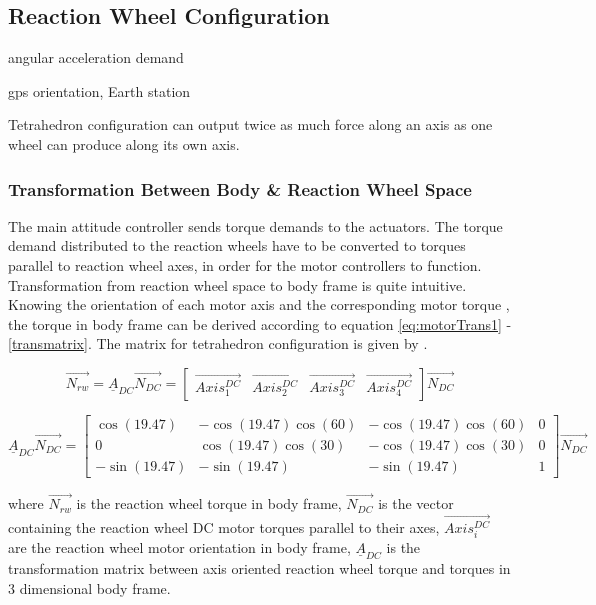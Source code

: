 
\subsection{Reaction Wheel Configuration}

angular acceleration demand \cite{reactionWheelConfigThesis} 

gps orientation, Earth station

Tetrahedron configuration can output twice as much force along an axis as one wheel can produce along its own axis.

\subsubsection{Transformation Between Body \& Reaction Wheel Space}

The main attitude controller sends torque demands to the actuators. The torque demand distributed to the reaction wheels have to be converted to torques parallel to reaction wheel axes, in order for the motor controllers to function. Transformation from reaction wheel space to body frame is quite intuitive. Knowing the orientation of each motor axis and the corresponding motor torque 
, the torque in body frame can be derived according to equation \ref{eq:motorTrans1} - \ref{transmatrix}. The matrix for tetrahedron configuration is given by \cite{reactionWheelConfigThesis}.

\begin{equation}
\label{eq:motorTrans1}
\vec{N_{rw}} = \underline{A}_{DC} \vec{N_{DC}} = \begin{bmatrix}
\vec{Axis^{DC}_{1}}       & \vec{Axis^{DC}_{2}}   & \vec{Axis^{DC}_{3}}   & \vec{Axis^{DC}_{4}} 
\end{bmatrix} \vec{N_{DC}}
\end{equation}

\begin{equation}
\underline{A}_{DC} \vec{N_{DC}}  = 
\begin{bmatrix}
\cos(19.47)       & -\cos(19.47) \cos(60)  &  -\cos(19.47) \cos(60)  & 0 \\
0       & \cos(19.47) \cos(30)  &  -\cos(19.47) \cos(30)  & 0 \\
-\sin(19.47)       & -\sin(19.47)   &  -\sin(19.47)   & 1
\end{bmatrix} \vec{N_{DC}}
\label{transmatrix}
\end{equation}

where $\vec{N_{rw}}$ is the reaction wheel torque in body frame, $\vec{N_{DC}}$ is the vector containing the reaction wheel DC motor torques parallel to their axes, $\vec{Axis^{DC}_{i}}$ are the reaction wheel motor orientation in body frame, $\underline{A}_{DC}$ is the transformation matrix between axis oriented reaction wheel torque and torques in 3 dimensional body frame.


